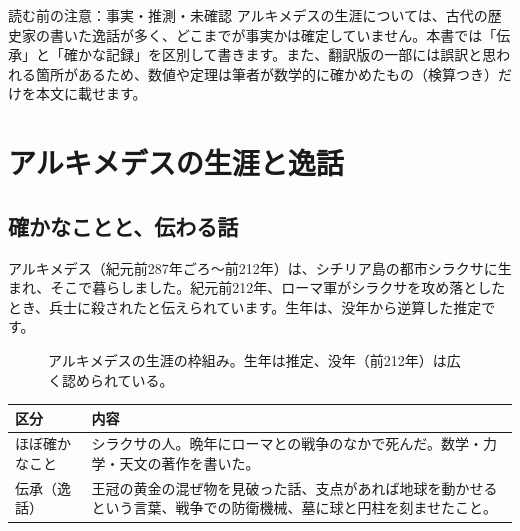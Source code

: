 \documentclass[a4paper,11pt,openany]{ltjsbook}
\begin{document}
\begin{notebox}{読む前の注意：事実・推測・未確認}
アルキメデスの生涯については、古代の歴史家の書いた逸話が多く、どこまでが事実かは確定していません。本書では「伝承」と「確かな記録」を区別して書きます。また、翻訳版の一部には誤訳と思われる箇所があるため、数値や定理は筆者が数学的に確かめたもの（検算つき）だけを本文に載せます。
\end{notebox}

\chapter{アルキメデスの生涯と逸話}

\section{確かなことと、伝わる話}

アルキメデス（紀元前287年ごろ〜前212年）は、シチリア島の都市シラクサに生まれ、そこで暮らしました。紀元前212年、ローマ軍がシラクサを攻め落としたとき、兵士に殺されたと伝えられています。生年は、没年から逆算した推定です。

\begin{figure}[htbp]
\centering
{}
\caption{アルキメデスの生涯の枠組み。生年は推定、没年（前212年）は広く認められている。}
\end{figure}

\begin{center}
\begin{tabular}{p{3.5cm}p{9cm}}
\toprule
区分 & 内容 \\
\midrule
ほぼ確かなこと & シラクサの人。晩年にローマとの戦争のなかで死んだ。数学・力学・天文の著作を書いた。\\
伝承（逸話） & 王冠の黄金の混ぜ物を見破った話、支点があれば地球を動かせるという言葉、戦争での防衛機械、墓に球と円柱を刻ませたこと。\\
\bottomrule
\end{tabular}
\end{center}
\end{document}
